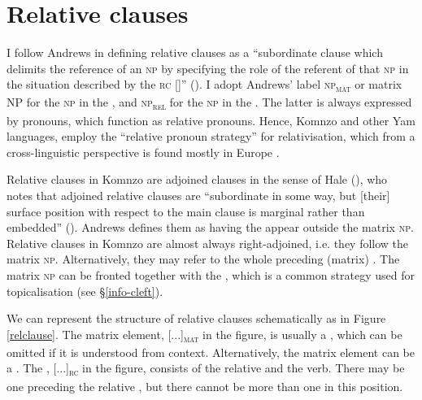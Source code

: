 \section{Relative clauses}\label{relclauses}

I follow Andrews in defining relative clauses as a ``subordinate clause which delimits the reference of an \textsc{np} by specifying the role of the referent of that \textsc{np} in the situation described by the \textsc{rc} []'' (\citeyear[206]{Andrews:2007relclauses}). I adopt Andrews' label \textsc{np}\textsubscript{\textsc{mat}} or matrix \textsc{NP} for the \textsc{np} in the , and \textsc{np}\textsubscript{\textsc{rel}} for the \textsc{np} in the . The latter is always expressed by  pronouns, which function as relative pronouns. Hence, Komnzo and other Yam languages, employ the ``relative pronoun strategy'' for relativisation, which from a cross-linguistic perspective is found mostly in Europe \citep{Haspelmath:2001}.%

Relative clauses in Komnzo are adjoined clauses in the sense of Hale (\citeyear{Hale:1976adjoined}), who notes that adjoined relative clauses are ``subordinate in some way, but [their] surface position with respect to the main clause is marginal rather than embedded'' (\citeyear[78]{Hale:1976adjoined}). Andrews defines them as having the  appear outside the matrix \textsc{np}. Relative clauses in Komnzo are almost always right-adjoined, i.e. they follow the matrix \textsc{np}. Alternatively, they may refer to the whole preceding (matrix) . The matrix \textsc{np} can be fronted together with the , which is a common strategy used for topicalisation (see \S{}\ref{info-cleft}).%

We can represent the structure of relative clauses schematically as in Figure \ref{relclause}. The matrix element, [...]\textsubscript{\textsc{mat}} in the figure, is usually a , which can be omitted if it is understood from context. Alternatively, the matrix element can be a . The , [...]\textsubscript{\textsc{rc}} in the figure, consists of the relative  and the verb. There may be one  preceding the relative , but there cannot be more than one  in this position.%

